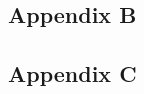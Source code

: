 \documentclass[Afour,sageh,times] {sagej}
\begin{document}
	
	
	\subsection{Appendix B}
\lipsum[1-1]
	
	\subsection{Appendix C}
\lipsum[1-1]
	
	
\end{document}

